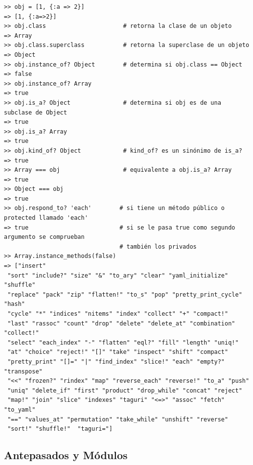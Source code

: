 \begin{verbatim}
>> obj = [1, {:a => 2}]
=> [1, {:a=>2}]
>> obj.class                      # retorna la clase de un objeto
=> Array
>> obj.class.superclass           # retorna la superclase de un objeto
=> Object
>> obj.instance_of? Object        # determina si obj.class == Object
=> false
>> obj.instance_of? Array
=> true
>> obj.is_a? Object               # determina si obj es de una subclase de Object
=> true
>> obj.is_a? Array
=> true
>> obj.kind_of? Object            # kind_of? es un sinónimo de is_a?
=> true
>> Array === obj                  # equivalente a obj.is_a? Array
=> true
>> Object === obj
=> true
>> obj.respond_to? 'each'        # si tiene un método público o protected llamado 'each'
=> true                          # si se le pasa true como segundo argumento se comprueban
                                 # también los privados
>> Array.instance_methods(false) 
=> ["insert"
 "sort" "include?" "size" "&" "to_ary" "clear" "yaml_initialize" "shuffle"
 "replace" "pack" "zip" "flatten!" "to_s" "pop" "pretty_print_cycle" "hash"
 "cycle" "*" "indices" "nitems" "index" "collect" "+" "compact!"
 "last" "rassoc" "count" "drop" "delete" "delete_at" "combination" "collect!"
 "select" "each_index" "-" "flatten" "eql?" "fill" "length" "uniq!"
 "at" "choice" "reject!" "[]" "take" "inspect" "shift" "compact"
 "pretty_print" "[]=" "|" "find_index" "slice!" "each" "empty?" "transpose"
 "<<" "frozen?" "rindex" "map" "reverse_each" "reverse!" "to_a" "push"
 "uniq" "delete_if" "first" "product" "drop_while" "concat" "reject"
 "map!" "join" "slice" "indexes" "taguri" "<=>" "assoc" "fetch" "to_yaml"
 "==" "values_at" "permutation" "take_while" "unshift" "reverse"
 "sort!" "shuffle!"  "taguri="]
\end{verbatim}

  \subsection{Antepasados y Módulos}
  
